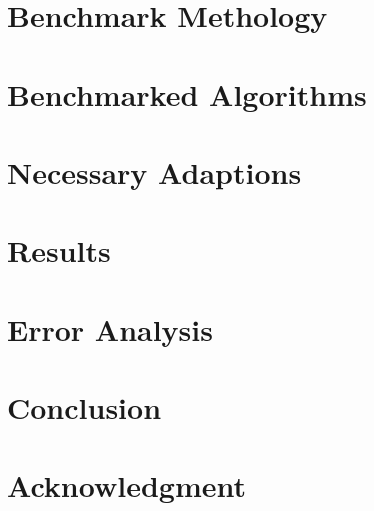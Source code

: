 \documentclass[conference]{IEEEtran}
\begin{document}
\section{Benchmark Methology}


\section{Benchmarked Algorithms}


% 

\section{Necessary Adaptions}


\section{Results}


\section{Error Analysis}


\section{Conclusion}
% 


\section*{Acknowledgment}
% 




\end{document}
